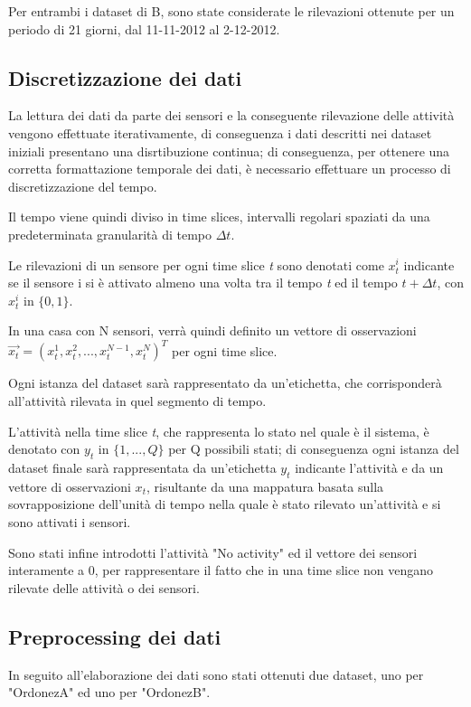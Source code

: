 \documentclass[10pt,a4paper]{article}
\begin{document}
Per entrambi i dataset di B, sono state considerate le rilevazioni ottenute per un periodo di 21 giorni, dal 11-11-2012 al 2-12-2012.

\subsection{Discretizzazione dei dati}
La lettura dei dati da parte dei sensori e la conseguente rilevazione delle attività vengono effettuate iterativamente, di conseguenza i dati descritti nei dataset iniziali presentano una disrtibuzione continua; di conseguenza, per ottenere una corretta formattazione temporale dei dati, è necessario effettuare un processo di discretizzazione del tempo.

Il tempo viene quindi diviso in time slices, intervalli regolari spaziati da una predeterminata granularità di tempo $ \Delta t $.

Le rilevazioni di un sensore per ogni time slice \textit{t} sono denotati come $ x^{i}_{t} $ indicante se il sensore i si è attivato almeno una volta tra il tempo \textit{t} ed il tempo $ t + \Delta t $, con $ x^{i}_{t} $ in $ \{0, 1\} $. 

In una casa con N sensori, verrà quindi definito un vettore di osservazioni $ \vec{x_{t}}  = (x^{1}_{t} , x^{2}_{t} , . . . , x^{N-1}_{t} , x^{N}_{t} )^{T} $   per ogni time slice.

Ogni istanza del dataset sarà rappresentato da un'etichetta, che corrisponderà all'attività rilevata in quel segmento di tempo.

L'attività nella time slice \textit{t}, che rappresenta lo stato nel quale è il sistema, è denotato con $ y_{t} $ in $ \{1, . . . , Q\} $ per Q possibili stati; di conseguenza ogni istanza del dataset finale sarà rappresentata da un'etichetta $ y_{t} $ indicante l'attività e da un vettore di osservazioni $ x_{t} $, risultante da una mappatura basata sulla sovrapposizione dell'unità di tempo nella quale è stato rilevato un'attività e si sono attivati i sensori.

 Sono stati infine introdotti l'attività "No activity" ed il vettore dei sensori interamente a 0, per rappresentare il fatto che in una time slice non vengano rilevate delle attività o dei sensori.

\subsection{Preprocessing dei dati}
In seguito all'elaborazione dei dati sono stati ottenuti due dataset, uno per "OrdonezA" ed uno per "OrdonezB".
\end{document}
